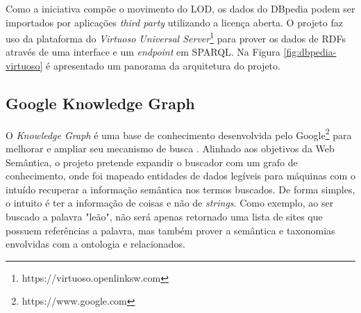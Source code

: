 Como a iniciativa compõe o movimento do LOD, os dados do DBpedia podem ser importados por aplicações \textit{third party} utilizando a licença aberta. O projeto faz uso da plataforma do \textit{Virtuoso Universal Server}\footnote{https://virtuoso.openlinksw.com} para prover os dados de RDFs através de uma interface e um \textit{endpoint} em SPARQL. Na Figura \ref{fig:dbpedia-virtuoso} é apresentado um panorama da arquitetura do projeto.

\subsection{Google Knowledge Graph}

O \textit{Knowledge Graph} é uma base de conhecimento desenvolvida pelo Google\footnote{https://www.google.com} para melhorar e ampliar seu mecanismo de busca \citep{GoogleKnowledge}. Alinhado aos objetivos da Web Semântica, o projeto pretende expandir o buscador com um grafo de conhecimento, onde foi mapeado entidades de dados legíveis para máquinas com o intuído recuperar a informação semântica nos termos buscados. De forma simples, o intuito é ter a informação de coisas e não de \textit{strings}. Como exemplo, ao ser buscado a palavra "leão", não será apenas retornado uma lista de sites que possuem referências a palavra, mas também prover a semântica e taxonomias envolvidas com a ontologia e relacionados.


